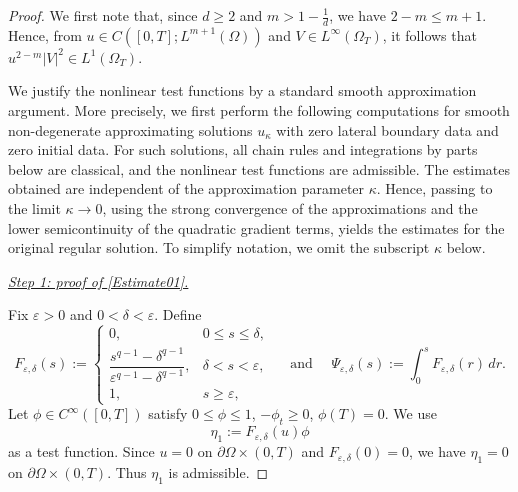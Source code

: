 \documentclass{amsart}
\numberwithin{equation}{section}
\begin{document}
\begin{proof}
We first note that, since $d\ge2$ and $m>1-\frac1d$, we have
$2-m\le m+1$. Hence, from
$u\in C([0,T];L^{m+1}(\Omega))$ and $V\in L^\infty(\Omega_T)$, it follows that $u^{2-m}|V|^2\in L^1(\Omega_T)$.

We justify the nonlinear test functions by a standard smooth approximation argument. More precisely, we first perform the following computations for smooth non-degenerate approximating solutions $u_\kappa$ with zero lateral boundary data and zero initial data. For such solutions, all chain rules and integrations by parts below are classical, and the nonlinear test functions are admissible. The estimates obtained are independent of the approximation parameter $\kappa$. Hence, passing to the limit $\kappa\to0$, using the strong convergence of the approximations and the lower semicontinuity of the quadratic gradient terms, yields the estimates for the original regular solution. To simplify notation, we omit the subscript $\kappa$ below.






\smallskip
\noindent
\underline{\emph{Step 1: proof of \eqref{Estimate01}.}}

Fix $\varepsilon>0$ and $0<\delta<\varepsilon$. Define
\[
F_{\varepsilon,\delta}(s):=
\begin{cases}
0, & 0\le s\le \delta,\\[1mm]
\dfrac{s^{q-1}-\delta^{q-1}}
{\varepsilon^{q-1}-\delta^{q-1}},
& \delta<s<\varepsilon,\\[3mm]
1, & s\ge \varepsilon,
\end{cases} 
\quad \text{ and }
\quad 
\Psi_{\varepsilon,\delta}(s)
:=
\int_0^sF_{\varepsilon,\delta}(r)\,dr.
\]
Let $\phi\in C^\infty([0,T])$ satisfy $0\le \phi\le1$, $-\phi_t\ge0$, $\phi(T)=0$.
We use
\[
\eta_1:=F_{\varepsilon,\delta}(u)\phi
\]
as a test function. Since $u=0$ on $\partial\Omega\times(0,T)$ and
$F_{\varepsilon,\delta}(0)=0$, we have $\eta_1=0$ on $\partial\Omega\times(0,T)$.
Thus $\eta_1$ is admissible.


\end{proof}
\end{document}
